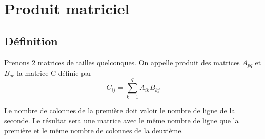 \documentclass[french]{yLectureNote}
\begin{document}
\section{Produit matriciel}
\subsection{Définition}
\begin{definition}
Prenons 2 matrices de tailles quelconques. On appelle produit des matrices \(A_{pq}\) et \(B_{qr}\) la matrice C définie par \[C_{ij} = \sum^{q}_{k=1} A_{ik}B_{kj}\]
\end{definition}
Le nombre de {\color{Red}colonnes de la premi\`ere} doit valoir le {\color{blue}nombre de ligne de la seconde}. Le r\'esultat sera une matrice avec le m\^eme {\color{orange}nombre de ligne que la premi\`ere} et le m\^eme {\color{green}nombre de colonnes de la deuxi\`eme}.

%
\end{document}
